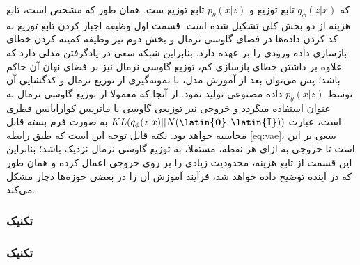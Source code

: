 که $q_\phi(z|x)$ تابع توزیع \encoder{} و $p_\theta(x|z)$ تابع توزیع \decoder ست. همان طور که مشخص است، تابع هزینه از دو بخش کلی تشکیل شده است. قسمت اول وظیفه اجبار کردن تابع توزیع \encoder{} به کد کردن داده‌ها در فضای گاوسی نرمال و بخش دوم نیز وظیفه کمینه کردن خطای بازسازی داده ورودی را بر عهده دارد. بنابراین شبکه سعی در یادگرفتن مدلی دارد که علاوه بر داشتن خطای بازسازی کم، توزیع گاوسی نرمال نیز بر فضای نهان آن حاکم باشد؛ پس می‌توان بعد از آموزش مدل، با نمونه‌گیری از توزیع نرمال و کدگشایی آن توسط $p_\theta(x|z)$ داده مصنوعی تولید نمود. از آنجا که معمولا از توزیع گاوسی نرمال به عنوان \priordist{} استفاده میگردد و خروجی \encoder{} نیز توزیعی گاوسی با ماتریس کوارایانس قطری است، عبارت $KL(q_\phi(z|x) || N(\textbf{\latin{0}},\textbf{\latin{I}}))$ به صورت فرم بسته قابل محاسبه خواهد بود. نکته قابل توجه این است که طبق رابطه \ref{eq:vae}، سعی بر این است تا خروجی \encoder{} به ازای هر نقطه، مستقلا، به توزیع گاوسی نرمال نزدیک باشد؛ بنابراین این قسمت از تابع هزینه، محدودیت زیادی را بر روی خروجی \encoder{} اعمال کرده و همان طور که در آینده توضیح داده خواهد شد، فرآیند آموزش آن را در بعضی حوزه‌ها دچار مشکل می‌کند. \\
\subsubsection{تکنیک \reparametrization{}}
\subsubsection{تکنیک \reparametrization{}}

